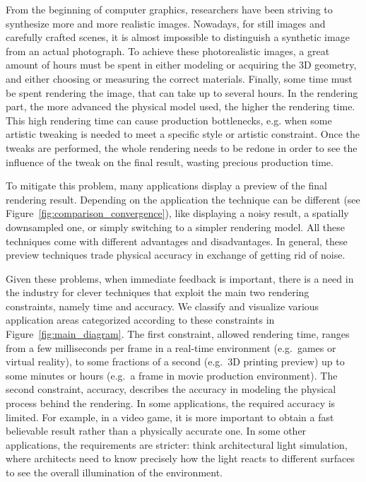 From the beginning of computer graphics, researchers have been striving to synthesize more and more realistic images. Nowadays, for still images and carefully crafted scenes, it is almost impossible to distinguish a synthetic image from an actual photograph. To achieve these photorealistic images, a great amount of hours must be spent in either modeling or acquiring the 3D geometry, and either choosing or measuring the correct materials. Finally, some time must be spent rendering the image, that can take up to several hours. In the rendering part, the more advanced the physical model used, the higher the rendering time. This high rendering time can cause production bottlenecks, e.g. when some artistic tweaking is needed to meet a specific style or artistic constraint. Once the tweaks are performed, the whole rendering needs to be redone in order to see the influence of the tweak on the final result, wasting precious production time. 

To mitigate this problem, many applications display a preview of the final rendering result. Depending on the application the technique can be different (see Figure~\ref{fig:comparison_convergence}), like displaying a noisy result, a spatially downsampled one, or simply switching to a simpler rendering model. All these techniques come with different advantages and disadvantages. In general, these preview techniques trade physical accuracy in exchange of getting rid of noise. 

Given these problems, when immediate feedback is important, there is a need in the industry for clever techniques that exploit the main two rendering constraints, namely time and accuracy. We classify and visualize various application areas categorized according to these constraints in Figure~\ref{fig:main_diagram}. The first constraint, allowed rendering time, ranges from a few milliseconds per frame in a real-time environment (e.g.\ games or virtual reality), to some fractions of a second (e.g.\ 3D printing preview) up to some minutes or hours (e.g.\ a frame in movie production environment). The second constraint, accuracy, describes the accuracy in modeling the physical process behind the rendering. In some applications, the required accuracy is limited. For example, in a video game, it is more important to obtain a fast believable result rather than a physically accurate one. In some other applications, the requirements are stricter: think architectural light simulation, where architects need to know precisely how the light reacts to different surfaces to see the overall illumination of the environment. 

